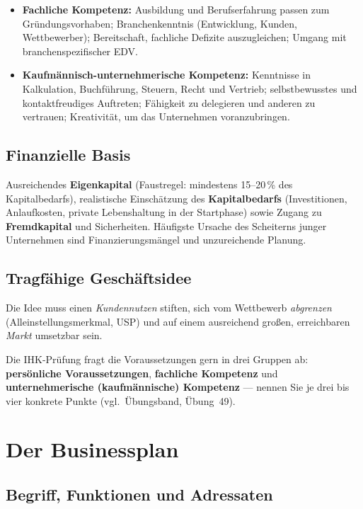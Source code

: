 \documentclass[11pt, a4paper]{article}
\begin{document}
\begin{itemize}
  \item \textbf{Fachliche Kompetenz:} Ausbildung und Berufserfahrung passen zum
    Gründungsvorhaben; Branchenkenntnis (Entwicklung, Kunden, Wettbewerber); Bereitschaft,
    fachliche Defizite auszugleichen; Umgang mit branchenspezifischer EDV.
  \item \textbf{Kaufmännisch-unternehmerische Kompetenz:} Kenntnisse in Kalkulation,
    Buchführung, Steuern, Recht und Vertrieb; selbstbewusstes und kontaktfreudiges
    Auftreten; Fähigkeit zu delegieren und anderen zu vertrauen; Kreativität, um das
    Unternehmen voranzubringen.
\end{itemize}

\subsection{Finanzielle Basis}

Ausreichendes \textbf{Eigenkapital} (Faustregel: mindestens 15--20\,\% des
Kapitalbedarfs), realistische Einschätzung des \textbf{Kapitalbedarfs} (Investitionen,
Anlaufkosten, private Lebenshaltung in der Startphase) sowie Zugang zu
\textbf{Fremdkapital} und Sicherheiten. Häufigste Ursache des Scheiterns junger
Unternehmen sind Finanzierungsmängel und unzureichende Planung.

\subsection{Tragfähige Geschäftsidee}

Die Idee muss einen \emph{Kundennutzen} stiften, sich vom Wettbewerb \emph{abgrenzen}
(Alleinstellungsmerkmal, USP) und auf einem ausreichend großen, erreichbaren \emph{Markt}
umsetzbar sein.

\begin{merksatz}
Die IHK-Prüfung fragt die Voraussetzungen gern in drei Gruppen ab: \textbf{persönliche
Voraussetzungen}, \textbf{fachliche Kompetenz} und \textbf{unternehmerische
(kaufmännische) Kompetenz} --- nennen Sie je drei bis vier konkrete Punkte
(vgl.\ Übungsband, Übung~49).
\end{merksatz}

\section{Der Businessplan}

\subsection{Begriff, Funktionen und Adressaten}
\end{document}
